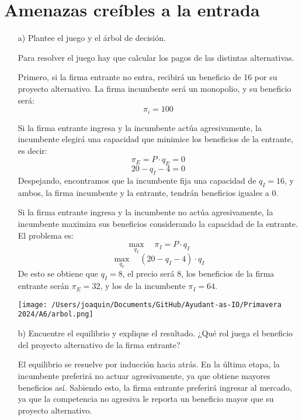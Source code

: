 \documentclass{exam}
\begin{document}
\section{Amenazas creíbles a la entrada}
\begin{itemize}
\item[a)] Plantee el juego y el árbol de decisión.
    \begin{solution}
        Para resolver el juego hay que calcular los pagos de las distintas alternativas.

        Primero, si la firma entrante no entra, recibirá un beneficio de 16 por su proyecto alternativo. La firma incumbente será un monopolio, y su beneficio será:
        \[
        \pi_i = 100
        \]

        Si la firma entrante ingresa y la incumbente actúa agresivamente, la incumbente elegirá una capacidad que minimice los beneficios de la entrante, es decir:
        \[
        \pi_E = P \cdot q_E = 0
        \]
        \[
        20 - q_I - 4 = 0
        \]
        Despejando, encontramos que la incumbente fija una capacidad de \( q_I = 16 \), y ambos, la firma incumbente y la entrante, tendrán beneficios iguales a 0.

        Si la firma entrante ingresa y la incumbente no actúa agresivamente, la incumbente maximiza sus beneficios considerando la capacidad de la entrante. El problema es:
        \[
        \max_{q_I} \quad \pi_I = P \cdot q_I
        \]
        \[
        \max_{q_I} \quad (20 - q_I - 4) \cdot q_I
        \]
        De esto se obtiene que \( q_I = 8 \), el precio será 8, los beneficios de la firma entrante serán \( \pi_E = 32 \), y los de la incumbente \( \pi_I = 64 \).\newline
        \begin{center}
            \texttt{[image: /Users/joaquin/Documents/GitHub/Ayudant-as-IO/Primavera 2024/A6/arbol.png]}
        \end{center}
        
    \end{solution}

    \item[b)] Encuentre el equilibrio y explique el resultado. ¿Qué rol juega el beneficio del proyecto alternativo de la firma entrante?
    \begin{solution}
        El equilibrio se resuelve por inducción hacia atrás. En la última etapa, la incumbente preferirá no actuar agresivamente, ya que obtiene mayores beneficios así. Sabiendo esto, la firma entrante preferirá ingresar al mercado, ya que la competencia no agresiva le reporta un beneficio mayor que su proyecto alternativo.


\end{solution}
\end{itemize}
\end{document}
